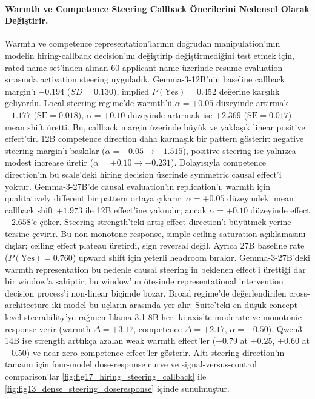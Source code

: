 \documentclass[twocolumn]{article}
\begin{document}
\paragraph{Warmth ve Competence Steering Callback Önerilerini Nedensel Olarak Değiştirir.}
Warmth ve competence representation'larının doğrudan manipulation'ının modelin
hiring-callback decision'ını değiştirip değiştirmediğini test etmek için,
\citet{gallo2024warmth} rated name set'inden alınan 60 applicant name üzerinde
resume evaluation sırasında activation steering uyguladık. Gemma-3-12B'nin
baseline callback margin'ı $-0.194$ ($\mathit{SD} = 0.130$), implied
$P(\text{Yes}) = 0.452$ değerine karşılık geliyordu. Local steering regime'de
warmth'ü $\alpha = +0.05$ düzeyinde artırmak $+1.177$
($\mathrm{SE} = 0.018$), $\alpha = +0.10$ düzeyinde artırmak ise $+2.369$
($\mathrm{SE} = 0.017$) mean shift üretti. Bu, callback margin üzerinde büyük
ve yaklaşık linear positive effect'tir. 12B competence direction daha karmaşık
bir pattern gösterir: negative steering margin'ı baskılar
($\alpha = -0.05 \to -1.515$), positive steering ise yalnızca modest increase
üretir ($\alpha = +0.10 \to +0.231$). Dolayısıyla competence direction'ın bu
scale'deki hiring decision üzerinde symmetric causal effect'i yoktur.
Gemma-3-27B'de causal evaluation'ın replication'ı, warmth için qualitatively
different bir pattern ortaya çıkarır. $\alpha = +0.05$ düzeyindeki mean
callback shift $+1.973$ ile 12B effect'ine yakındır; ancak
$\alpha = +0.10$ düzeyinde effect $-2.658$'e çöker. Steering strength'teki artış
effect direction'ı büyütmek yerine tersine çevirir. Bu non-monotone response,
simple ceiling saturation açıklamasını dışlar; ceiling effect plateau üretirdi,
sign reversal değil. Ayrıca 27B baseline rate ($P(\text{Yes}) = 0.760$) upward
shift için yeterli headroom bırakır. Gemma-3-27B'deki warmth representation bu
nedenle causal steering'in beklenen effect'i ürettiği dar bir window'a sahiptir;
bu window'un ötesinde representational intervention decision process'i
non-linear biçimde bozar. Broad regime'de değerlendirilen cross-architecture iki
model bu uçların arasında yer alır: Suite'teki en düşük concept-level
steerability'ye rağmen Llama-3.1-8B her iki axis'te moderate ve monotonic response
verir (warmth $\Delta = +3.17$, competence $\Delta = +2.17$,
$\alpha = +0.50$). Qwen3-14B ise strength arttıkça azalan weak warmth effect'ler
($+0.79$ at $+0.25$, $+0.60$ at $+0.50$) ve near-zero competence effect'ler
gösterir. Altı steering direction'ın tamamı için four-model dose-response curve
ve signal-versus-control comparison'lar
\autoref{fig:fig17_hiring_steering_callback} ile
\autoref{fig:fig13_dense_steering_doseresponse} içinde sunulmuştur.
\end{document}
